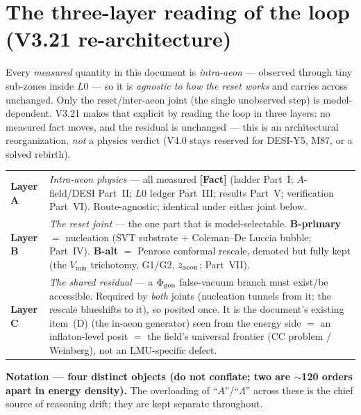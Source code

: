 \documentclass[11pt]{article}
\newcommand{\Fact}{\textbf{\textcolor{green!45!black}{[Fact]}}}
\begin{document}
\section{The three-layer reading of the loop (V3.21 re-architecture)}
Every \emph{measured} quantity in this document is \emph{intra-aeon} --- observed through tiny sub-zones inside $L0$ --- so it is \emph{agnostic to how the reset works} and carries across unchanged. Only the reset/inter-aeon joint (the single unobserved step) is model-dependent. V3.21 makes that explicit by reading the loop in three layers; no measured fact moves, and the residual is unchanged --- this is an architectural reorganization, \emph{not} a physics verdict (V4.0 stays reserved for DESI-Y5, M87, or a solved rebirth).
\begin{center}\small
\begin{tabular}{@{}p{}p{}@{}}\toprule
\textbf{Layer A} & \emph{Intra-aeon physics} --- all measured \Fact{} (ladder Part~I; $A$-field/DESI Part~II; $L0$ ledger Part~III; results Part~V; verification Part~VI). Route-agnostic; identical under either joint below.\\
\textbf{Layer B} & \emph{The reset joint} --- the one part that is model-selectable. \textbf{B-primary} $=$ nucleation (SVT substrate $+$ Coleman--De Luccia bubble; Part~IV). \textbf{B-alt} $=$ Penrose conformal rescale, demoted but fully kept (the $V_{\min}$ trichotomy, G1/G2, $z_{\rm aeon}$; Part~VII).\\
\textbf{Layer C} & \emph{The shared residual} --- a $\Phi_{\rm gen}$ false-vacuum branch must exist/be accessible. Required by \emph{both} joints (nucleation tunnels from it; the rescale blueshifts to it), so posited once. It is the document's existing item~(D) (the in-aeon generator) seen from the energy side $=$ an inflaton-level posit $=$ the field's universal frontier (CC problem / Weinberg), not an LMU-specific defect.\\
\bottomrule
\end{tabular}
\end{center}
\textbf{Notation --- four distinct objects (do not conflate; two are $\sim$120 orders apart in energy density).} The overloading of ``$A$''/``$\Lambda$'' across these is the chief source of reasoning drift; they are kept separate throughout.
\end{document}
